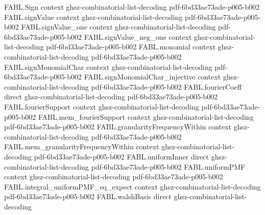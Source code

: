 \begin{theorem}
\label{FABL.FiniteFourierBasis.fourierCoeff_zeroMultiIndex}
\leanok
{}
\proofstep
  {FABL.Sign}
  {context}
  {ghsz-combinatorial-list-decoding}
  {pdf-6bd33ae73ade-p005-b002}
\proofstep
  {FABL.signValue}
  {context}
  {ghsz-combinatorial-list-decoding}
  {pdf-6bd33ae73ade-p005-b002}
\proofstep
  {FABL.signValue_one}
  {context}
  {ghsz-combinatorial-list-decoding}
  {pdf-6bd33ae73ade-p005-b002}
\proofstep
  {FABL.signValue_neg_one}
  {context}
  {ghsz-combinatorial-list-decoding}
  {pdf-6bd33ae73ade-p005-b002}
\proofstep
  {FABL.monomial}
  {context}
  {ghsz-combinatorial-list-decoding}
  {pdf-6bd33ae73ade-p005-b002}
\proofstep
  {FABL.signMonomialChar}
  {context}
  {ghsz-combinatorial-list-decoding}
  {pdf-6bd33ae73ade-p005-b002}
\proofstep
  {FABL.signMonomialChar_injective}
  {context}
  {ghsz-combinatorial-list-decoding}
  {pdf-6bd33ae73ade-p005-b002}
\proofstep
  {FABL.fourierCoeff}
  {direct}
  {ghsz-combinatorial-list-decoding}
  {pdf-6bd33ae73ade-p005-b002}
\proofstep
  {FABL.fourierSupport}
  {context}
  {ghsz-combinatorial-list-decoding}
  {pdf-6bd33ae73ade-p005-b002}
\proofstep
  {FABL.mem_fourierSupport}
  {context}
  {ghsz-combinatorial-list-decoding}
  {pdf-6bd33ae73ade-p005-b002}
\proofstep
  {FABL.granularityFrequencyWithin}
  {context}
  {ghsz-combinatorial-list-decoding}
  {pdf-6bd33ae73ade-p005-b002}
\proofstep
  {FABL.mem_granularityFrequencyWithin}
  {context}
  {ghsz-combinatorial-list-decoding}
  {pdf-6bd33ae73ade-p005-b002}
\proofstep
  {FABL.uniformInner}
  {direct}
  {ghsz-combinatorial-list-decoding}
  {pdf-6bd33ae73ade-p005-b002}
\proofstep
  {FABL.uniformPMF}
  {context}
  {ghsz-combinatorial-list-decoding}
  {pdf-6bd33ae73ade-p005-b002}
\proofstep
  {FABL.integral_uniformPMF_eq_expect}
  {context}
  {ghsz-combinatorial-list-decoding}
  {pdf-6bd33ae73ade-p005-b002}
\proofstep
  {FABL.walshBasis}
  {direct}
  {ghsz-combinatorial-list-decoding}

\end{theorem}

